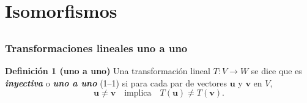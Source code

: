 \section{Isomorfismos}

\subsection{}

{\nologo 
\begin{frame}\frametitle{Transformaciones lineales uno a uno}

\vspace{-3mm}
\begin{block}{\textbf{Definición 1 (uno a uno) }}
	\justifying
	Una transformación lineal $T:V\to W$ se dice que es \textbf{\textit{inyectiva}} o \textbf{\textit{uno a uno}} (1--1) si
	para cada par de vectores $\mathbf{u}$ y $\mathbf{v}$ en $V$,
	\[
		\mathbf{u}\neq \mathbf{v} \quad \text{implica} \quad T(\mathbf{u})\neq T(\mathbf{v}).
	\]
\end{block}


\end{frame}}
